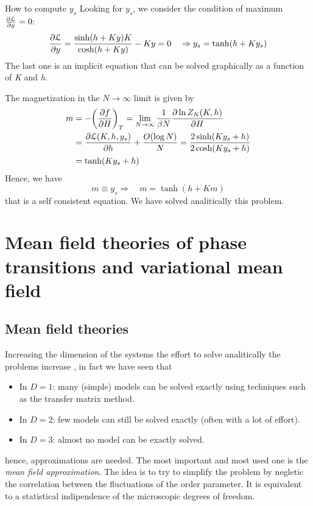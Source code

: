\documentclass[../main/main.tex]{subfiles}
\begin{document}
\begin{example}{How to compute \( y_s \)}{}
Looking for \( y_s \), we consider the condition of maximum \( \pdv{\mathcal{L} }{y} = 0  \):
\begin{equation*}
  \pdv{\mathcal{L}}{y} = \frac{\sinh (h+Ky)K}{\cosh (h+Ky)} - Ky = 0 \quad   \Rightarrow y_s = \tanh (h+Ky_s)
\end{equation*}
The last one is an implicit equation that can be solved graphically as a function of \emph{K} and \emph{h}.
\end{example}

The magnetization in the \( N \rightarrow \infty  \) limit is given by
\begin{equation*}
\begin{split}
m  &= - \qty( \pdv{f}{H})_T = \lim_{N \rightarrow \infty } \frac{1}{\beta N} \pdv{\ln{Z_N(K,h)} }{H}   \\
& =  \pdv{\mathcal{L} (K,h,y_s) }{h}  + \frac{O ( \log{N} )}{N} = \frac{2 \sinh(Ky_s+h)}{2 \cosh(K y_s+h)} \\
& = \tanh (K y_s +h)
\end{split}
\end{equation*}
Hence, we have
\begin{equation}
   m \equiv y_s \Rightarrow \quad m = \tanh (h+Km)
\end{equation}
that is a self consistent equation. We have solved analitically this problem.












\chapter{Mean field theories of phase transitions and variational mean field}

\section{Mean field theories}

Increasing the dimension of the systems the effort to solve analitically the problems increase , in fact we have seen that
\begin{itemize}
\item In \( D=1 \): many (simple) models can be solved exactly using techniques such as the transfer matrix method.
\item In \( D=2 \): few models can still be solved exactly (often with a lot of effort).
\item In \( D=3 \): almost no model can be exactly solved.
\end{itemize}
hence, approximations are needed.
The most important and most used one is the \emph{mean field approximation}. The idea is to try to simplify the problem by negletic the correlation between the fluctuations of the order parameter. It is equivalent to a statistical indipendence of the microscopic degrees of freedom.
\end{document}

